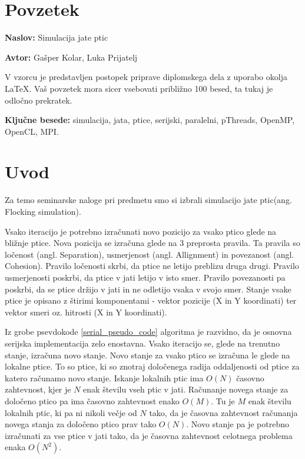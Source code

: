\documentclass[a4paper, 12pt]{book}
\newcommand{\ttitle}{Simulacija jate ptic}
\newcommand{\tauthor}{Gašper Kolar, Luka Prijatelj}
\newcommand{\tkeywords}{simulacija, jata, ptice, serijski, paralelni, pThreads, OpenMP, OpenCL, MPI}
\newcommand{\clearemptydoublepage}{\newpage{\pagestyle{empty}\cleardoublepage}}
\begin{document}
\clearemptydoublepage

\chapter*{Povzetek}

\noindent\textbf{Naslov:} \ttitle
\bigskip

\noindent\textbf{Avtor:} \tauthor
\bigskip

\noindent V vzorcu je predstavljen postopek priprave diplomskega dela z uporabo okolja \LaTeX. Vaš povzetek mora sicer vsebovati približno 100 besed, ta tukaj je odločno prekratek.
\bigskip

\noindent\textbf{Ključne besede:} \tkeywords.
\clearemptydoublepage


\mainmatter
\setcounter{page}{1}
\pagestyle{fancy}

\chapter{Uvod}
Za temo seminarske naloge pri predmetu smo si izbrali simulacijo jate ptic(ang. Flocking simulation).

Vsako iteracijo je potrebno izračunati novo pozicijo za vsako ptico glede na bližnje ptice. Nova pozicija se izračuna glede na 3 preprosta pravila. Ta pravila so ločenost (angl. Separation), usmerjenost (angl. Allignment) in povezanost (angl. Cohesion). Pravilo ločenosti skrbi, da ptice ne letijo preblizu druga drugi. Pravilo usmerjenosti poskrbi, da ptice v jati letijo v isto smer. Pravilo povezanosti pa poskrbi, da se ptice držijo v jati in ne odletijo vsaka v svojo smer. Stanje vsake ptice je opisano z štirimi komponentami - vektor pozicije (X in Y koordinati) ter vektor smeri oz. hitrosti (X in Y koordinati). 

Iz grobe psevdokode \ref{serial_pseudo_code} algoritma je razvidno, da je osnovna serijska implementacija zelo enostavna. Vsako iteracijo se, glede na trenutno stanje, izračuna novo stanje. Novo stanje za vsako ptico se izračuna le glede na lokalne ptice. To so ptice, ki so znotraj določenega radija oddaljenosti od ptice za katero računamo novo stanje. Iskanje lokalnih ptic ima $O(N)$ časovno zahtevnost, kjer je $N$ enak številu vseh ptic v jati. Računanje novega stanje za določeno ptico pa ima časovno zahtevnost enako $O(M)$. Tu je $M$ enak številu lokalnih ptic, ki pa ni nikoli večje od $N$ tako, da je časovna zahtevnost računanja novega stanja za določeno ptico prav tako $O(N)$. Novo stanje pa je potrebno izračunati za vse ptice v jati tako, da je časovna zahtevnost celotnega problema enaka $O(N^2)$. 
\end{document}

